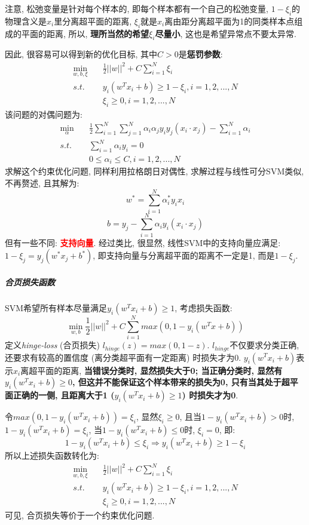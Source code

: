注意, 松弛变量是针对每个样本的, 即每个样本都有一个自己的松弛变量, $1-\xi_i$的物理含义是$x_i$里分离超平面的距离, $\xi_i$就是$x_i$离由距分离超平面为1的同类样本点组成的平面的距离, 所以, \textbf{理所当然的希望$\xi_i$尽量小}, 这也是希望异常点不要太异常. 

因此, 很容易可以得到新的优化目标, 其中$C > 0$是\textbf{惩罚参数}: 
\begin{align}
	\mathop{min}_{w, b, \xi}&\quad \frac{1}{2} ||w||^2 + C \sum_{i=1}^{N} \xi_i \nonumber \\
	s.t.&\quad y_i(w^T x_i + b) \geqslant 1 - \xi_i, i = 1, 2, ..., N \nonumber \\
		&\quad \xi_i \geq 0, i = 1, 2, ..., N \nonumber
\end{align}
该问题的对偶问题为: 
\begin{align}
	\mathop{min}_{\alpha}\quad &\frac{1}{2} \sum_{i=1}^N \sum_{j=1}^{N} \alpha_i \alpha_j y_i y_j (x_i \cdot x_j) - \sum_{i=1}^N \alpha_i \nonumber \\
	s.t.\quad &\sum_{i=1}^N \alpha_i y_i = 0 \nonumber \\
	&0 \leq \alpha_i \leq C, i = 1, 2, ..., N \nonumber
\end{align}
求解这个约束优化问题, 同样利用拉格朗日对偶性, 求解过程与线性可分SVM类似, 不再赘述, 且其解为: 
$$
w^* = \sum_{i=1}^N \alpha_i^* y_i x_i
$$
$$
b = y_j - \sum_{i=1}^N \alpha_i y_i (x_i \cdot x_j)
$$
但有一些不同: \textcolor{red}{\textbf{支持向量}}. 经过类比, 很显然, 线性SVM中的支持向量应满足: $1 - \xi_j = y_j ( w^* x_j + b^* ) $, 即支持向量与分离超平面的距离不一定是1, 而是$1 - \xi_j$. 

\subparagraph{合页损失函数}
SVM希望所有样本尽量满足$y_i( w^T x_i + b ) \geq 1$, 考虑损失函数: 
$$
\mathop{min}_{w, b} \frac{1}{2} ||w||^2 + C \sum_{i=1}^{N} max(0, 1 - y_i (w^T x + b))
$$
定义\textit{hinge-loss} (合页损失) $l_{hinge}(z) = max(0, 1-z)$. $l_{hinge}$不仅要求分类正确, 还要求有较高的置信度 (离分类超平面有一定距离) 时损失才为0. $y_i( w^T x_i + b )$表示$x_i$离超平面的距离, \textbf{当错误分类时, 显然损失大于0; 当正确分类时, 显然有$y_i( w^T x_i + b ) \geq 0$, 但这并不能保证这个样本带来的损失为0, 只有当其处于超平面正确的一侧, 且距离大于1 ($y_i( w^T x_i + b ) \geq 1$) 时损失才为0}. 

令$max(0, 1-y_i (w^T x_i + b)) = \xi_i$, 显然$\xi_i \geq 0$, 且当$1-y_i (w^T x_i + b) > 0$时, $1-y_i (w^T x_i + b) = \xi_i$, 当$1-y_i (w^T x_i + b) \leq 0$时, $\xi_i = 0$, 即: 
$$
1-y_i (w^T x_i + b) \leq \xi_i \Longrightarrow y_i (w^T x_i + b) \geq 1 - \xi_i
$$
所以上述损失函数转化为: 
\begin{align}
	\mathop{min}_{w, b, \xi}&\quad \frac{1}{2} ||w||^2 + C \sum_{i=1}^{N} \xi_i \nonumber \\
	s.t.&\quad y_i(w^T x_i + b) \geqslant 1 - \xi_i, i = 1, 2, ..., N \nonumber \\
	&\quad \xi_i \geq 0, i = 1, 2, ..., N \nonumber
\end{align}
可见, 合页损失等价于一个约束优化问题. 

